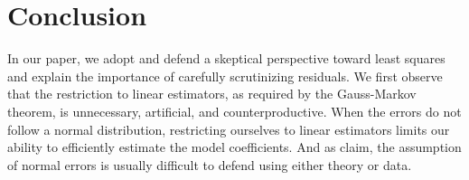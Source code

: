 \documentclass[12pt]{article}
\begin{document}
%

\section*{Conclusion}

In our paper, we adopt and defend a skeptical perspective toward least squares and explain the importance of carefully scrutinizing residuals.
We first observe that the restriction to linear estimators, as required by the Gauss-Markov theorem, is unnecessary, artificial, and counterproductive. 
When the errors do not follow a normal distribution, restricting ourselves to linear estimators limits our ability to efficiently estimate the model coefficients. And as \cite{BerryFeldman1985} claim, the assumption of normal errors is usually difficult to defend using either theory or data. 
\end{document}

